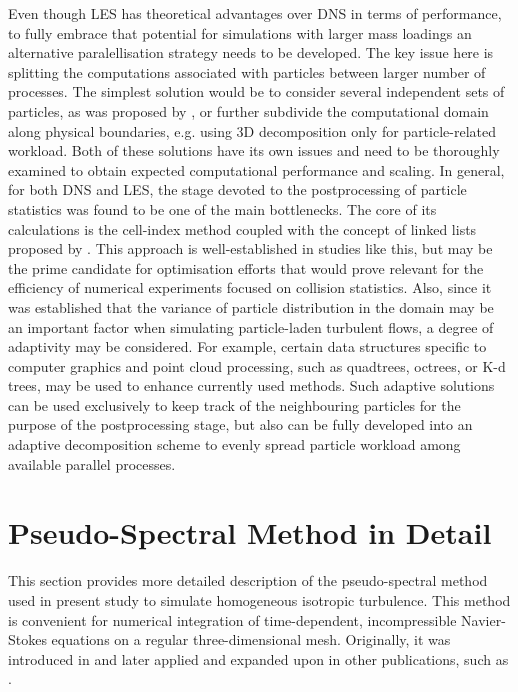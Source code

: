 \documentclass{pracamgren}
\begin{document}
Even though LES has theoretical advantages over DNS in terms of performance, to fully embrace that potential for simulations with larger mass loadings an alternative paralellisation strategy needs to be developed.
The key issue here is splitting the computations associated with particles between larger number of processes.
The simplest solution would be to consider several independent sets of particles, as was proposed by \textcite{Ayala2014}, or further subdivide the computational domain along physical boundaries, e.g. using 3D decomposition only for particle-related workload.
Both of these solutions have its own issues and need to be thoroughly examined to obtain expected computational performance and scaling.
In general, for both DNS and LES, the stage devoted to the postprocessing of particle statistics was found to be one of the main bottlenecks.
The core of its calculations is the cell-index method coupled with the concept of linked lists proposed by \textcite{Allen1987}.
This approach is well-established in studies like this, but may be the prime candidate for optimisation efforts that would prove relevant for the efficiency of numerical experiments focused on collision statistics.
Also, since it was established that the variance of particle distribution in the domain may be an important factor when simulating particle-laden turbulent flows, a degree of adaptivity may be considered.
For example, certain data structures specific to computer graphics and point cloud processing, such as quadtrees, octrees, or K-d trees, may be used to enhance currently used methods.
Such adaptive solutions can be used exclusively to keep track of the neighbouring particles for the purpose of the postprocessing stage, but also can be fully developed into an adaptive decomposition scheme to evenly spread particle workload among available parallel processes. 




\appendix
\chapter{Pseudo-Spectral Method in Detail}
\label{app:psm}

This section provides more detailed description of the pseudo-spectral method used in present study to simulate homogeneous isotropic turbulence. 
This method is convenient for numerical integration of time-dependent, incompressible Navier-Stokes equations on a regular three-dimensional mesh.
Originally, it was introduced in \textcite{Orszag1972} and later applied and expanded upon in other publications, such as \textcite{Rogallo1981,Eswaran1988,Pope2000,Peng2009}.
\end{document}
